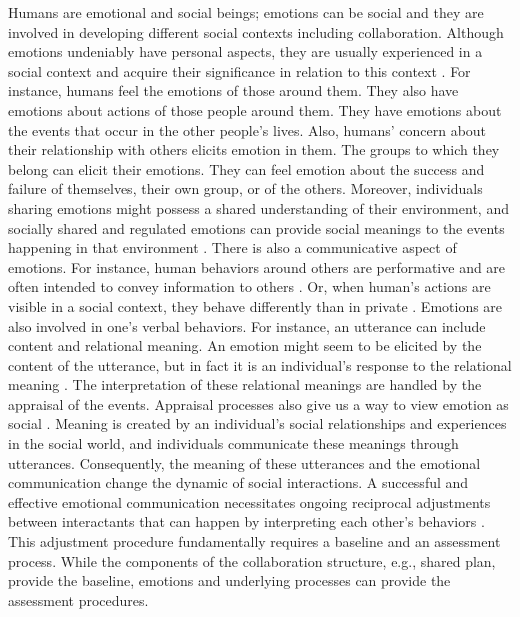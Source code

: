 Humans are emotional and social beings; emotions can be social and they are
involved in developing different social contexts including collaboration.
Although emotions undeniably have personal aspects, they are usually experienced
in a social context and acquire their significance in relation to this context
\cite{parkinson:emotion-social-interaction}. For instance, humans feel the
emotions of those around them. They also have emotions about actions of those
people around them. They have emotions about the events that occur in the other
people's lives. Also, humans' concern about their relationship with others
elicits emotion in them. The groups to which they belong can elicit their
emotions. They can feel emotion about the success and failure of themselves,
their own group, or of the others. Moreover, individuals sharing emotions might
possess a shared understanding of their environment, and socially shared and
regulated emotions can provide social meanings to the events happening in that
environment \cite{wisecup:sociology-emotions}. There is also a communicative
aspect of emotions. For instance, human behaviors around others are performative
and are often intended to convey information to others
\cite{goffman:self-presentation}. Or, when human's actions are visible in a
social context, they behave differently than in private
\cite{zajonc:social-facilitation}. Emotions are also involved in one's verbal
behaviors. For instance, an utterance can include content and relational
meaning. An emotion might seem to be elicited by the content of the utterance,
but in fact it is an individual's response to the relational meaning
\cite{planalp:communicating-emotion}. The interpretation of these relational
meanings are handled by the appraisal of the events. Appraisal processes also
give us a way to view emotion as social \cite{hooft:sharing-emotions}. Meaning
is created by an individual's social relationships and experiences in the social
world, and individuals communicate these meanings through utterances.
Consequently, the meaning of these utterances and the emotional communication
change the dynamic of social interactions. A successful and effective emotional
communication necessitates ongoing reciprocal adjustments between interactants
that can happen by interpreting each other's behaviors
\cite{parkinson:emotion-social-interaction}. This adjustment procedure
fundamentally requires a baseline and an assessment process. While the
components of the collaboration structure, e.g., shared plan, provide the
baseline, emotions and underlying processes can provide the assessment
procedures.

